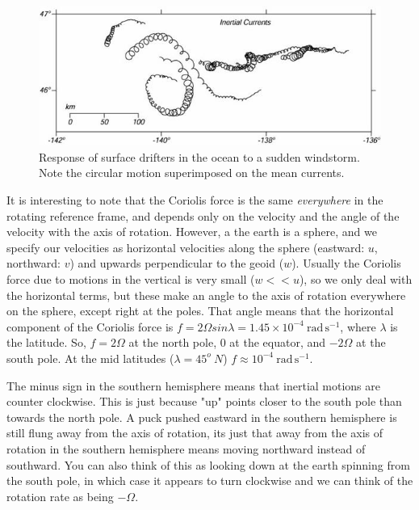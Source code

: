 \begin{figure}[hbt]
  \begin{center}
    \includegraphics{figs/Coriolis/inertial_currents}
    \caption{Response of surface drifters in the ocean to a sudden windstorm.  Note the circular motion superimposed on the mean currents.}
    \label{fig:inertial_currents}  
  \end{center}
\end{figure}


It is interesting to note that the Coriolis force is the same \emph{everywhere} in the rotating reference frame, and depends only on the velocity and the angle of the velocity with the axis of rotation.  However, a the earth is a sphere, and we specify our velocities as horizontal velocities along the sphere (eastward: $u$, northward: $v$) and upwards perpendicular to the geoid ($w$).  Usually the Coriolis force due to motions in the vertical is very small ($w<<u$), so we only deal with the horizontal terms, but these make an angle to the axis of rotation everywhere on the sphere, except 
right at the poles.  That angle means that the horizontal component of the Coriolis force is $f = 2\Omega sin\lambda = 1.45\times10^{-4}\ \mathrm{rad\, s^{-1}}$, where $\lambda$ is the latitude.  So, $f=2\Omega$ at the north pole, $0$ at the equator, and $-2\Omega$ at the south pole.  At the mid latitudes ($\lambda=45^o \ N$) $f\approx10^{-4}\ \mathrm{rad\,s^{-1}}$.  

The minus sign in the southern hemisphere means that inertial motions are counter clockwise.  This is just because "up" points closer to the south pole than towards the north pole.  A puck pushed eastward in the southern hemisphere is still flung away from the axis of rotation, its just that away from the axis of rotation in the southern hemisphere means moving northward instead of southward.  You can also think of this as looking down at the earth spinning from the south pole, in which case it appears to turn clockwise and we can think of the rotation rate as being $-\Omega$.  

